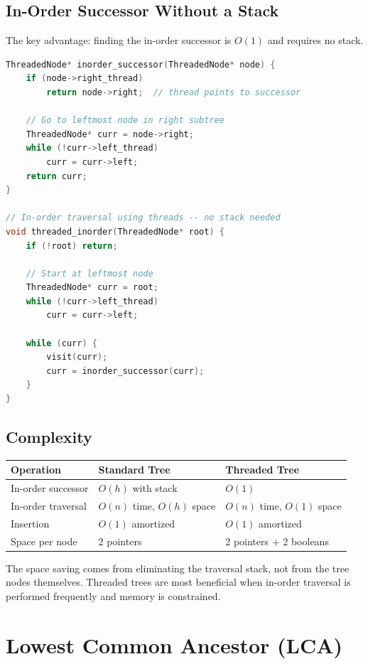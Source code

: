 \subsection{In-Order Successor Without a Stack}

The key advantage: finding the in-order successor is $O(1)$ and
requires no stack.

\begin{lstlisting}[language=C++]
ThreadedNode* inorder_successor(ThreadedNode* node) {
    if (node->right_thread)
        return node->right;  // thread points to successor

    // Go to leftmost node in right subtree
    ThreadedNode* curr = node->right;
    while (!curr->left_thread)
        curr = curr->left;
    return curr;
}

// In-order traversal using threads -- no stack needed
void threaded_inorder(ThreadedNode* root) {
    if (!root) return;

    // Start at leftmost node
    ThreadedNode* curr = root;
    while (!curr->left_thread)
        curr = curr->left;

    while (curr) {
        visit(curr);
        curr = inorder_successor(curr);
    }
}
\end{lstlisting}

\subsection{Complexity}

\begin{center}
\begin{tabular}{lll}
\toprule
Operation & Standard Tree & Threaded Tree \\
\midrule
In-order successor & $O(h)$ with stack & $O(1)$ \\
In-order traversal & $O(n)$ time, $O(h)$ space & $O(n)$ time, $O(1)$ space \\
Insertion & $O(1)$ amortized & $O(1)$ amortized \\
Space per node & 2 pointers & 2 pointers + 2 booleans \\
\bottomrule
\end{tabular}
\end{center}

The space saving comes from eliminating the traversal stack, not from
the tree nodes themselves.  Threaded trees are most beneficial when
in-order traversal is performed frequently and memory is constrained.

\section{Lowest Common Ancestor (LCA)}

